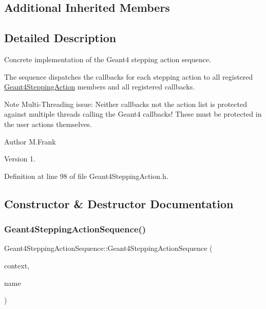 \subsection*{Additional Inherited Members}


\subsection{Detailed Description}
Concrete implementation of the Geant4 stepping action sequence. 

The sequence dispatches the callbacks for each stepping action to all registered \hyperlink{class_d_d4hep_1_1_simulation_1_1_geant4_stepping_action}{Geant4\+Stepping\+Action} members and all registered callbacks.

Note Multi-\/\+Threading issue\+: Neither callbacks not the action list is protected against multiple threads calling the Geant4 callbacks! These must be protected in the user actions themselves.

\begin{DoxyAuthor}{Author}
M.\+Frank 
\end{DoxyAuthor}
\begin{DoxyVersion}{Version}
1. 
\end{DoxyVersion}


Definition at line 98 of file Geant4\+Stepping\+Action.\+h.



\subsection{Constructor \& Destructor Documentation}
\hypertarget{class_d_d4hep_1_1_simulation_1_1_geant4_stepping_action_sequence_aa4a60d2c258df480a31085e49ebb2832}{}\label{class_d_d4hep_1_1_simulation_1_1_geant4_stepping_action_sequence_aa4a60d2c258df480a31085e49ebb2832} 
\subsubsection{\texorpdfstring{Geant4\+Stepping\+Action\+Sequence()}{Geant4SteppingActionSequence()}}
{\footnotesize\ttfamily Geant4\+Stepping\+Action\+Sequence\+::\+Geant4\+Stepping\+Action\+Sequence (\begin{DoxyParamCaption}\item[{\hyperlink{class_d_d4hep_1_1_simulation_1_1_geant4_context}{Geant4\+Context} $\ast$}]{context,  }\item[{const std\+::string \&}]{name }\end{DoxyParamCaption})}



